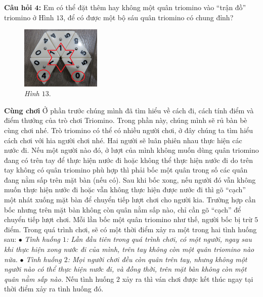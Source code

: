 {\begin{multicols}{2}
		\textbf{\color{toancuabi}Câu hỏi $\pmb{4}$:}
		\vskip 0.1cm
		Em có thể đặt thêm hay không một quân  triomino vào “trận đồ” triomino ở Hình $13$, để có được một bộ sáu quân triomino có chung đỉnh?		\begin{figure}[H]
			\centering
			\captionsetup{labelformat=empty, justification=centering}
			\includegraphics[width=0.34\textwidth]{h13a}
			\caption{\textit{\small Hình $13.$}}
			\vspace*{-5pt}
		\end{figure}
	\end{multicols}
	{\textbf{\color{toancuabi}\color{toancuabi} {Cùng chơi}}   
	\vskip 0.1cm
	Ở phần trước chúng mình đã tìm hiểu về cách đi, cách tính điểm và điểm thưởng của trò chơi Triomino. Trong phần  này, chúng mình sẽ rủ bàn bè cùng chơi nhé.
	\vskip 0.1cm
	Trò triomino có thể có nhiều người chơi, ở đây chúng ta tìm hiểu cách chơi với hia người chơi nhé. Hai người sẽ luân phiên nhau thực hiện các nước đi.
	\vskip 0.1cm
	Nếu một người nào đó, ở lượt của mình không muốn dùng quân triomino đang có trên tay để thực hiện nước đi hoặc không thể thực hiện nước đi do trên tay không có quân triomino phù hợp thì phải bốc một quân trong số các quân đang nằm sấp trên mặt bàn (nếu có). Sau khi bốc xong, nếu người đó vẫn không muốn thực hiện nước đi hoặc vẫn không thực hiện được nước đi thì gõ “cạch” một nhát xuống mặt bàn để chuyển tiếp lượt chơi cho người kia. Trường hợp cần bốc nhưng trên mặt bàn không còn quân nằm sấp nào, chỉ cần gõ “cạch” để chuyển tiếp lượt chơi. Mỗi lần bốc một quân triomino như thế, người bốc bị trừ $5$ điểm.
	\vskip 0.1cm
	Trong quá trình chơi, sẽ có một thời điểm xảy ra một trong hai tình huống sau:
	\vskip 0.1cm
	$\bullet$ \textit{Tình huống $1$: Lần đầu tiên trong quá trình chơi, có một người, ngay sau khi thực hiện xong nước đi của mình, trên tay không còn một quân triomino nào nữa.}
	\vskip 0.1cm
	$\bullet$ \textit{Tình huống $2$: Mọi người chơi đều còn quân trên tay, nhưng không một người nào có thể thực hiện nước đi, và đồng thời, trên mặt bàn không còn một quân nằm sấp nào.}
	\vskip 0.1cm
	Nếu tình huống $2$ xảy ra thì ván chơi được kết thúc ngay tại thời điểm xảy ra tình huống đó.
}}
